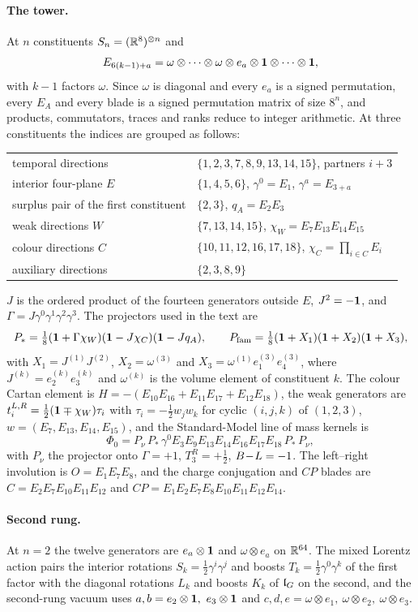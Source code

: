 \paragraph{The tower.} At $n$ constituents $S_n=(\mathbb{R}^8)^{\otimes n}$ and
\[
E_{6(k-1)+a}=\omega\otimes\cdots\otimes\omega\otimes e_a\otimes\mathbf 1\otimes\cdots\otimes\mathbf 1 ,
\]
with $k-1$ factors $\omega$. Since $\omega$ is diagonal and every $e_a$ is a signed permutation, every $E_A$ and every blade is a signed permutation matrix of size $8^n$,
and products, commutators, traces and ranks reduce to integer arithmetic. At three constituents the indices are grouped as follows:
\begin{center}
\small
\begin{tabular}{@{}ll@{}}
\toprule
temporal directions & $\{1,2,3,7,8,9,13,14,15\}$, partners $i+3$\\
interior four-plane $E$ & $\{1,4,5,6\}$, $\gamma^0=E_1$, $\gamma^a=E_{3+a}$\\
surplus pair of the first constituent & $\{2,3\}$, $q_A=E_2E_3$\\
weak directions $W$ & $\{7,13,14,15\}$, $\chi_W=E_7E_{13}E_{14}E_{15}$\\
colour directions $C$ & $\{10,11,12,16,17,18\}$, $\chi_C=\prod_{i\in C}E_i$\\
auxiliary directions & $\{2,3,8,9\}$\\
\bottomrule
\end{tabular}
\end{center}
$J$ is the ordered product of the fourteen generators outside $E$, $J^2=-\mathbf 1$, and $\Gamma=J\gamma^0\gamma^1\gamma^2\gamma^3$. The projectors used in the text are
\[
P_*=\tfrac18(\mathbf 1+\Gamma\chi_W)(\mathbf 1-J\chi_C)(\mathbf 1-Jq_A),\qquad P_{\rm fam}=\tfrac18(\mathbf 1+X_1)(\mathbf 1+X_2)(\mathbf 1+X_3),
\]
with $X_1=J^{(1)}J^{(2)}$, $X_2=\omega^{(3)}$ and $X_3=\omega^{(1)}e^{(3)}_1e^{(3)}_4$, where $J^{(k)}=e^{(k)}_2e^{(k)}_3$ and $\omega^{(k)}$ is the volume element of constituent
$k$. The colour Cartan element is $H=-(E_{10}E_{16}+E_{11}E_{17}+E_{12}E_{18})$, the weak generators are $t^{L,R}_i=\tfrac12(\mathbf 1\mp\chi_W)\tau_i$ with
$\tau_i=-\tfrac12w_jw_k$ for cyclic $(i,j,k)$ of $(1,2,3)$, $w=(E_7,E_{13},E_{14},E_{15})$, and the Standard-Model line of mass kernels is
\[
\Phi_0=P_\nu\,P_*\,\gamma^0E_3E_9E_{13}E_{14}E_{16}E_{17}E_{18}\,P_*\,P_\nu ,
\]
with $P_\nu$ the projector onto $\Gamma=+1$, $T^R_3=+\tfrac12$, $B\!-\!L=-1$. The left--right involution is $O=E_1E_7E_8$, and the charge conjugation and $CP$ blades are
$C=E_2E_7E_{10}E_{11}E_{12}$ and $CP=E_1E_2E_7E_8E_{10}E_{11}E_{12}E_{14}$.

\paragraph{Second rung.} At $n=2$ the twelve generators are $e_a\otimes\mathbf 1$ and $\omega\otimes e_a$ on $\mathbb{R}^{64}$. The mixed Lorentz action pairs the interior rotations
$S_k=\tfrac12\gamma^i\gamma^j$ and boosts $T_k=\tfrac12\gamma^0\gamma^k$ of the first factor with the diagonal rotations $L_k$ and boosts $K_k$ of $\mathfrak l_G$ on the second, and the
second-rung vacuum uses $a,b=e_2\otimes\id,\ e_3\otimes\id$ and $c,d,e=\omega\otimes e_1,\ \omega\otimes e_2,\ \omega\otimes e_3$.

